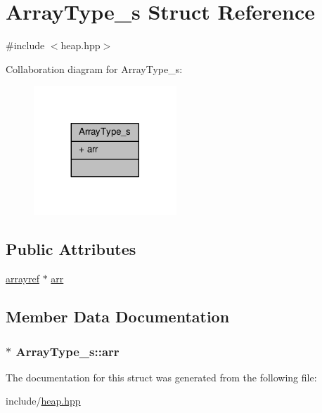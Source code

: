 \hypertarget{structArrayType__s}{\section{Array\+Type\+\_\+s Struct Reference}
\label{structArrayType__s}
}


{\ttfamily \#include $<$heap.\+hpp$>$}



Collaboration diagram for Array\+Type\+\_\+s\+:\nopagebreak
\begin{figure}[H]
\begin{center}
\leavevmode
\includegraphics[width=152pt]{structArrayType__s__coll__graph}
\end{center}
\end{figure}
\subsection*{Public Attributes}
\begin{DoxyCompactItemize}
\item 
\hyperlink{heap_8hpp_a02f27b1f1856ad001bcd2be51cef4faf}{arrayref} $\ast$ \hyperlink{structArrayType__s_a5d0ddd51febb6c6c8cda5f6d745011f1}{arr}
\end{DoxyCompactItemize}


\subsection{Member Data Documentation}
\hypertarget{structArrayType__s_a5d0ddd51febb6c6c8cda5f6d745011f1}{
\subsubsection[{arr}]{$\ast$ Array\+Type\+\_\+s\+::arr}}\label{structArrayType__s_a5d0ddd51febb6c6c8cda5f6d745011f1}


The documentation for this struct was generated from the following file\+:\begin{DoxyCompactItemize}
\item 
include/\hyperlink{heap_8hpp}{heap.\+hpp}\end{DoxyCompactItemize}
